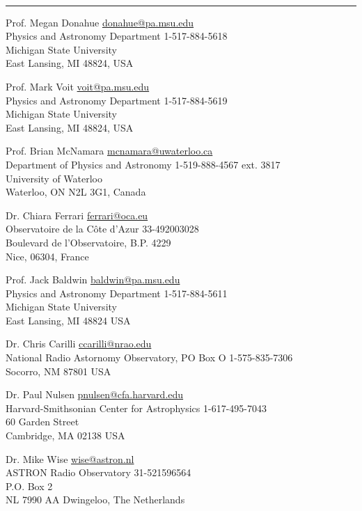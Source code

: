 \documentclass[12pt]{cv}
\newcommand{\myhead}{Cavagnolo, CV}
\begin{document}
\markright{\myhead}
{\large{}}\vspace{-0.3cm}\\
\rule{\linewidth}{0.5pt}
Prof. Megan Donahue \hfill \href{mailto:donahue@pa.msu.edu}{donahue@pa.msu.edu}\\
Physics and Astronomy Department \hfill 1-517-884-5618\\
Michigan State University\\
East Lansing, MI 48824, USA

Prof. Mark Voit \hfill \href{mailto:voit@pa.msu.edu}{voit@pa.msu.edu}\\
Physics and Astronomy Department \hfill 1-517-884-5619\\
Michigan State University\\
East Lansing, MI 48824, USA

Prof. Brian McNamara \hfill \href{mailto:mcnamara@uwaterloo.ca}{mcnamara@uwaterloo.ca}\\
Department of Physics and Astronomy \hfill 1-519-888-4567 ext. 3817\\
University of Waterloo\\
Waterloo, ON N2L 3G1, Canada

Dr. Chiara Ferrari \hfill \href{mailto:ferrari@oca.eu}{ferrari@oca.eu}\\
Observatoire de la C\^ote d’Azur \hfill 33-492003028\\
Boulevard de l’Observatoire, B.P. 4229\\
Nice, 06304, France

Prof. Jack Baldwin \hfill \href{mailto:baldwin@pa.msu.edu}{baldwin@pa.msu.edu}\\
Physics and Astronomy Department \hfill 1-517-884-5611\\
Michigan State University\\
East Lansing, MI 48824 USA

Dr. Chris Carilli \hfill \href{mailto:ccarilli@nrao.edu}{ccarilli@nrao.edu}\\
National Radio Astornomy Observatory, PO Box O \hfill 1-575-835-7306\\
Socorro, NM 87801 USA

Dr. Paul Nulsen \hfill \href{mailto:pnulsen@cfa.harvard.edu}{pnulsen@cfa.harvard.edu}\\
Harvard-Smithsonian Center for Astrophysics \hfill 1-617-495-7043\\
60 Garden Street\\
Cambridge, MA 02138 USA

Dr. Mike Wise \hfill \href{mailto:wise@astron.nl}{wise@astron.nl}\\
ASTRON Radio Observatory \hfill 31-521596564\\
P.O. Box 2\\
NL 7990 AA Dwingeloo, The Netherlands\\
\end{document}
